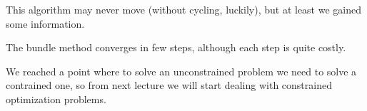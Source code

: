 \documentclass[ComputationalMathematics.tex]{subfiles}
\begin{document}
This algorithm may never move (without cycling, luckily), but at least we gained some information.

The bundle method converges in few steps, although each step is quite costly.

We reached a point where to solve an unconstrained problem we need to solve a contrained one, so from next lecture we will start dealing with constrained optimization problems.
\end{document}
